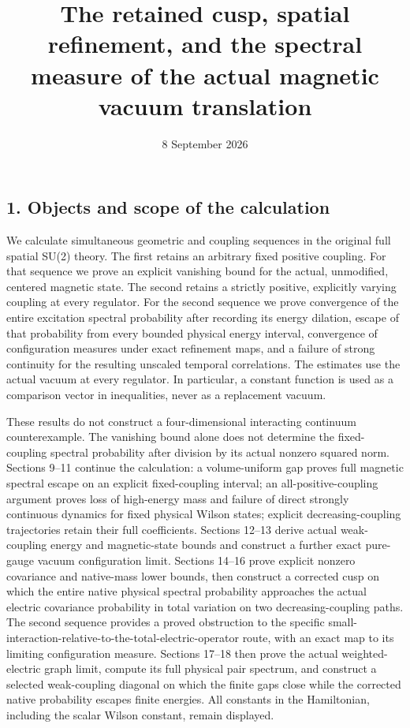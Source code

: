 \documentclass[
  11pt,
]{article}
\title{The retained cusp, spatial refinement, and the spectral measure
of the actual magnetic vacuum translation}
\author{}
\date{8 September 2026}
\begin{document}
\maketitle

\subsection{1. Objects and scope of the
calculation}\label{objects-and-scope-of-the-calculation}

We calculate simultaneous geometric and coupling sequences in the
original full spatial SU(2) theory. The first retains an arbitrary fixed
positive coupling. For that sequence we prove an explicit vanishing
bound for the actual, unmodified, centered magnetic state. The second
retains a strictly positive, explicitly varying coupling at every
regulator. For the second sequence we prove convergence of the entire
excitation spectral probability after recording its energy dilation,
escape of that probability from every bounded physical energy interval,
convergence of configuration measures under exact refinement maps, and a
failure of strong continuity for the resulting unscaled temporal
correlations. The estimates use the actual vacuum at every regulator. In
particular, a constant function is used as a comparison vector in
inequalities, never as a replacement vacuum.

These results do not construct a four-dimensional interacting continuum
counterexample. The vanishing bound alone does not determine the
fixed-coupling spectral probability after division by its actual nonzero
squared norm. Sections 9--11 continue the calculation: a volume-uniform
gap proves full magnetic spectral escape on an explicit fixed-coupling
interval; an all-positive-coupling argument proves loss of high-energy
mass and failure of direct strongly continuous dynamics for fixed
physical Wilson states; explicit decreasing-coupling trajectories retain
their full coefficients. Sections 12--13 derive actual weak-coupling
energy and magnetic-state bounds and construct a further exact
pure-gauge vacuum configuration limit. Sections 14--16 prove explicit
nonzero covariance and native-mass lower bounds, then construct a
corrected cusp on which the entire native physical spectral probability
approaches the actual electric covariance probability in total variation
on two decreasing-coupling paths. The second sequence provides a proved
obstruction to the specific
small-interaction-relative-to-the-total-electric-operator route, with an
exact map to its limiting configuration measure. Sections 17--18 then
prove the actual weighted-electric graph limit, compute its full
physical pair spectrum, and construct a selected weak-coupling diagonal
on which the finite gaps close while the corrected native probability
escapes finite energies. All constants in the Hamiltonian, including the
scalar Wilson constant, remain displayed.
\end{document}
